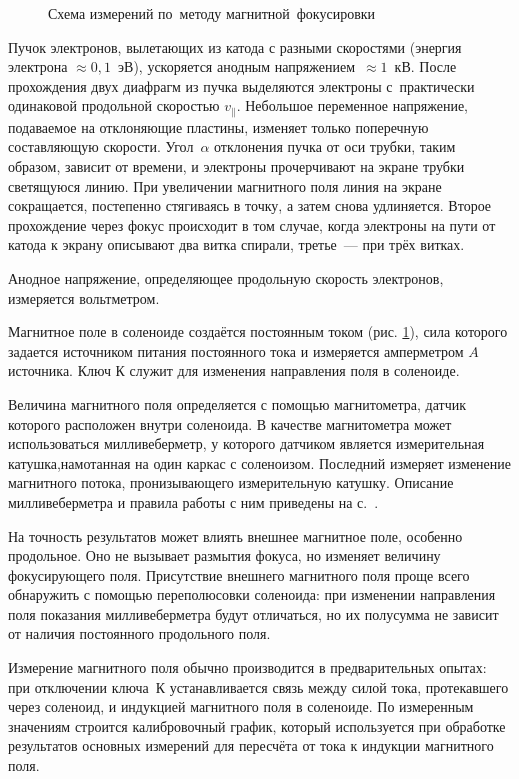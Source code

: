\begin{figure}
\caption{ Схема измерений по~методу магнитной~фокусировки}
\label{fig3.1.1}
\end{figure}

Пучок электронов, вылетающих из катода с разными скоростями (энергия электрона $\approx 0,1$~эВ), ускоряется анодным напряжением~$\approx 1$~кВ. После прохождения двух диафрагм из пучка выделяются электроны с~практически одинаковой
продольной скоростью $v_{\parallel}$. Небольшое переменное напряжение, подаваемое  на отклоняющие пластины, изменяет  только поперечную составляющую скорости. Угол~$\alpha$ отклонения пучка от оси трубки, таким образом, зависит  от времени, и электроны прочерчивают на экране трубки светящуюся линию. При увеличении магнитного поля линия на экране сокращается, постепенно стягиваясь в точку, а затем снова удлиняется. Второе прохождение через фокус происходит в том случае, когда электроны на пути от катода к экрану описывают два витка спирали, третье~--- при трёх витках.

Анодное напряжение, определяющее продольную скорость электронов, измеряется вольтметром.

Магнитное поле в соленоиде создаётся постоянным током (рис. \ref{fig3.1.1}), сила которого задается источником питания постоянного тока и измеряется амперметром $A$ источника. Ключ К служит для изменения направления поля в соленоиде.

Величина магнитного поля определяется с помощью магнитометра, датчик которого расположен внутри соленоида. В качестве магнитометра  может использоваться милливеберметр, у  которого датчиком является измерительная катушка,намотанная на один каркас с соленоизом. Последний
измеряет изменение магнитного потока, пронизывающего измерительную катушку. Описание милливеберметра и правила работы с ним приведены на с.~\pageref{MWB}.

На точность результатов может влиять внешнее магнитное поле, особенно продольное. Оно не вызывает размытия фокуса, но изменяет величину фокусирующего поля. Присутствие внешнего магнитного поля проще всего обнаружить с помощью
переполюсовки соленоида: при изменении направления поля показания милливеберметра будут отличаться, но их полусумма не зависит от наличия постоянного продольного поля.

Измерение магнитного поля обычно производится в предварительных опытах: при отключении ключа~К устанавливается связь между силой тока, протекавшего через соленоид, и индукцией магнитного поля в соленоиде. По измеренным значениям строится калибровочный график, который используется при обработке результатов основных измерений для пересчёта от тока к индукции магнитного поля.

